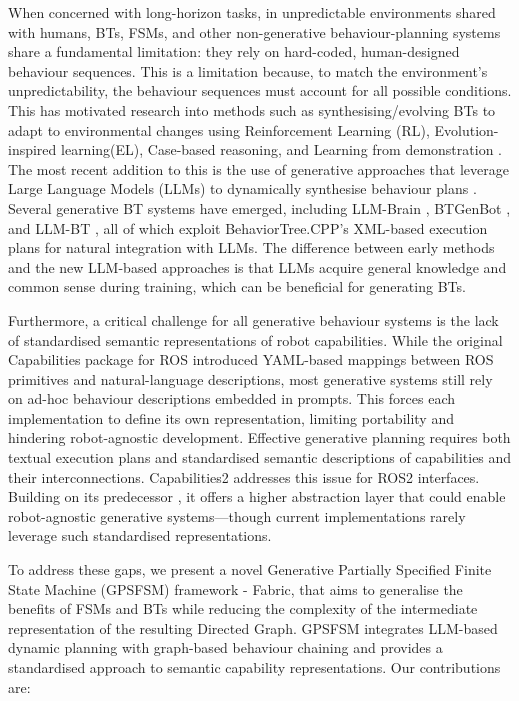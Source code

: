 \documentclass[letterpaper, 10pt, conference]{ieeeconf}      %
\begin{document}
When concerned with long-horizon tasks, in unpredictable environments shared with humans, BTs, FSMs, and other non-generative behaviour-planning systems share a fundamental limitation: they rely on hard-coded, human-designed behaviour sequences. This is a limitation because, to match the environment's unpredictability, the behaviour sequences must account for all possible conditions. This has motivated research into methods such as synthesising/evolving BTs to adapt to environmental changes using Reinforcement Learning (RL), Evolution-inspired learning(EL), Case-based reasoning, and Learning from demonstration \cite{IOVINO2022104096, 9562088}. The most recent addition to this is the use of generative approaches that leverage Large Language Models (LLMs) to dynamically synthesise behaviour plans \cite{ahn_as_2022, rana_sayplan_2023}. Several generative BT systems have emerged, including LLM-Brain \cite{lykov_llm-brain_2023}, BTGenBot \cite{izzo_btgenbot_2024}, and LLM-BT \cite{zhou_llm-bt_2024}, all of which exploit BehaviorTree.CPP's \cite{colledanchise2021implementation} XML-based execution plans for natural integration with LLMs. The difference between early methods and the new LLM-based approaches is that LLMs acquire general knowledge and common sense during training, which can be beneficial for generating BTs.

Furthermore, a critical challenge for all generative behaviour systems is the lack of standardised semantic representations of robot capabilities. While the original Capabilities package for ROS \cite{woodall_ros_2014} introduced YAML-based mappings between ROS primitives and natural-language descriptions, most generative systems still rely on ad-hoc behaviour descriptions embedded in prompts. This forces each implementation to define its own representation, limiting portability and hindering robot-agnostic development. Effective generative planning requires both textual execution plans and standardised semantic descriptions of capabilities and their interconnections. Capabilities2 \cite{pritchard_capabilities2_2025} addresses this issue for ROS2 interfaces. Building on its predecessor \cite{woodall_ros_2014}, it offers a higher abstraction layer that could enable robot-agnostic generative systems—though current implementations rarely leverage such standardised representations.

To address these gaps, we present a novel Generative Partially Specified Finite State Machine (GPSFSM) framework - Fabric, that aims to generalise the benefits of FSMs and BTs while reducing the complexity of the intermediate representation of the resulting Directed Graph. GPSFSM integrates LLM-based dynamic planning with graph-based behaviour chaining and provides a standardised approach to semantic capability representations. Our contributions are:
\end{document}
